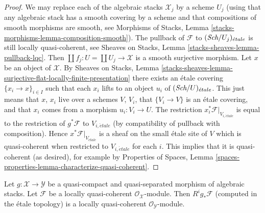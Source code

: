 \begin{proof}
We may replace each of the algebraic stacks $\mathcal{X}_j$ by
a scheme $U_j$ (using that any algebraic stack has a smooth covering by
a scheme and that compositions of smooth morphisms are smooth, see
Morphisms of Stacks, Lemma \ref{stacks-morphisms-lemma-composition-smooth}).
The pullback of $\mathcal{F}$ to $(\textit{Sch}/U_j)_{\acute{e}tale}$ is still
locally quasi-coherent, see
Sheaves on Stacks, Lemma \ref{stacks-sheaves-lemma-pullback-lqc}.
Then $\coprod f_j : U = \coprod U_j \to \mathcal{X}$ is a smooth surjective
morphism. Let $x$ be an object of $\mathcal{X}$. By
Sheaves on Stacks, Lemma
\ref{stacks-sheaves-lemma-surjective-flat-locally-finite-presentation}
there exists an \'etale covering $\{x_i \to x\}_{i \in I}$
such that each $x_i$ lifts to an object $u_i$ of $(\textit{Sch}/U)_{\acute{e}tale}$.
This just means that $x$, $x_i$ live over a schemes $V$, $V_i$, that
$\{V_i \to V\}$ is an \'etale covering, and that $x_i$ comes from
a morphism $u_i : V_i \to U$. The restriction
$x_i^*\mathcal{F}|_{V_{i, \acute{e}tale}}$ is equal to the restriction
of $g^*\mathcal{F}$ to $V_{i, \acute{e}tale}$ (by compatibility of
pullback with composition). Hence $x^*\mathcal{F}|_{V_{\acute{e}tale}}$
is a sheaf on the small \'etale site of $V$ which is quasi-coherent
when restricted to $V_{i, \acute{e}tale}$ for each $i$.
This implies that it is quasi-coherent (as desired), for example by
Properties of Spaces, Lemma
\ref{spaces-properties-lemma-characterize-quasi-coherent}.
\end{proof}

\begin{lemma}
\label{lemma-pushforward-locally-quasi-coherent}
Let $g : \mathcal{X} \to \mathcal{Y}$ be a quasi-compact and
quasi-separated morphism of algebraic stacks. Let 
$\mathcal{F}$ be a locally quasi-coherent
$\mathcal{O}_\mathcal{X}$-module. Then $R^ig_*\mathcal{F}$
(computed in the \'etale topology) is
a locally quasi-coherent $\mathcal{O}_\mathcal{Y}$-module.
\end{lemma}

